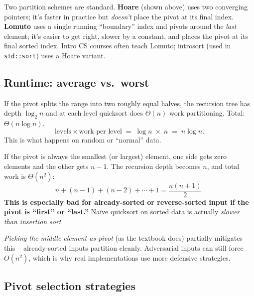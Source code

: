 \documentclass[11pt]{article}
\begin{document}
\begin{notebox}
Two partition schemes are standard. \textbf{Hoare} (shown above)
uses two converging pointers; it's faster in practice but
\emph{doesn't} place the pivot at its final index. \textbf{Lomuto}
uses a single running ``boundary'' index and pivots around the
\emph{last} element; it's easier to get right, slower by a constant,
and places the pivot at its final sorted index. Intro CS courses
often teach Lomuto; introsort (used in \texttt{std::sort}) uses a
Hoare variant.
\end{notebox}

\subsection{Runtime: average vs.\ worst}

\begin{ideabox}
If the pivot splits the range into two roughly equal halves, the
recursion tree has depth $\log_2 n$ and at each level quicksort does
$\Theta(n)$ work partitioning. Total: $\Theta(n \log n)$.
\[
  \text{levels} \times \text{work per level}
  \;=\; \log n \;\times\; n \;=\; n \log n.
\]
This is what happens on random or ``normal'' data.
\end{ideabox}

\begin{warnbox}
If the pivot is always the smallest (or largest) element, one side
gets zero elements and the other gets $n - 1$. The recursion depth
becomes $n$, and total work is $\Theta(n^2)$:
\[
  n + (n - 1) + (n - 2) + \cdots + 1 = \frac{n(n+1)}{2}.
\]
\textbf{This is especially bad for already-sorted or reverse-sorted
input if the pivot is ``first'' or ``last.''} Na\"ive quicksort on
sorted data is actually \emph{slower than insertion sort}.

\emph{Picking the middle element as pivot} (as the textbook does)
partially mitigates this -- already-sorted inputs partition cleanly.
Adversarial inputs can still force $O(n^2)$, which is why real
implementations use more defensive strategies.
\end{warnbox}

\subsection{Pivot selection strategies}
\end{document}
